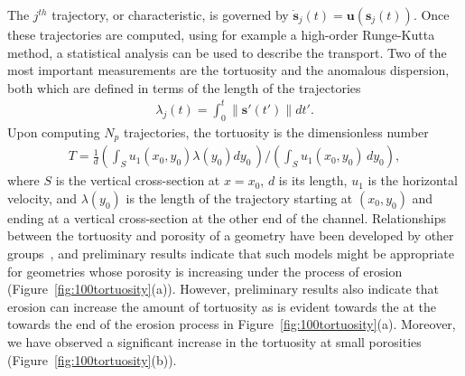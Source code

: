 \documentclass[11pt]{article}
\newcommand{\bvec}[1]{{\mathbf{#1}}}
\newcommand{\uu}{\bvec{u}}
\renewcommand{\ss}{{\mathbf{s}}}
\begin{document}
The $j^{th}$ trajectory, or characteristic, is governed by $\dot{\ss}_j(t) = \uu(\ss_j(t))$. Once these trajectories are computed, using for example a high-order Runge-Kutta method, a statistical analysis can be used to describe the transport. Two of the most important measurements are the tortuosity and the anomalous dispersion, both which are defined in terms of the length of the trajectories \begin{align}
  \lambda_j(t) = \int_{0}^{t} \|\ss'(t')\| dt'.
\end{align}
Upon computing $N_p$ trajectories, the tortuosity is the dimensionless number
\begin{align}
  T = \frac{1}{d} \left(\int_{S} u_1(x_0,y_0)\lambda(y_0) dy_0\, \right)
  \Bigg/ \left(\int_S u_1(x_0,y_0)\, dy_0 \right),
\end{align}
where $S$ is the vertical cross-section at $x=x_0$, $d$ is its length,
$u_1$ is the horizontal velocity, and $\lambda(y_0)$ is the length of
the trajectory starting at $(x_0,y_0)$ and ending at a vertical
cross-section at the other end of the channel. Relationships between the
tortuosity and porosity of a geometry have been developed by other
groups~\cite{kop-kat-tim1996, dud-koz-mat2011, mat-kha-koz2008}, and
preliminary results indicate that such models might be appropriate for
geometries whose porosity is increasing under the process of erosion
(Figure~\ref{fig:100tortuosity}(a)). However, preliminary results also
indicate that erosion can increase the amount of tortuosity as is
evident towards the at the towards the end of the erosion process in
Figure~\ref{fig:100tortuosity}(a). Moreover, we have observed a
significant increase in the tortuosity at small porosities
(Figure~\ref{fig:100tortuosity}(b)).
\end{document}

